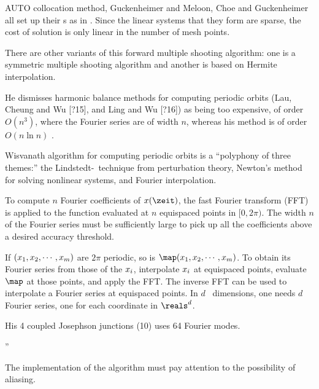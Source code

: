 \begin{description}
{AUTO collocation method, Guckenheimer and
Meloon, Choe and Guckenheimer all set up their
\po s as in . Since the linear systems that they form
are sparse, the cost of solution is only linear in the number of mesh
points.

There are other variants of this forward multiple shooting algorithm: one
is a symmetric multiple shooting algorithm and another is based on
Hermite interpolation.

He dismisses harmonic balance methods for computing periodic orbits (Lau,
Cheung and Wu [?15], and Ling and Wu [?16]) as being too expensive, of
order $O(n^3)$, where the Fourier series are of width $n$, whereas his
method is of order $O(n\ln{n})$ .

Wisvanath algorithm for computing periodic orbits is a ``polyphony of
three themes:'' the Lindstedt-\Poincare\ technique from perturbation
theory, Newton's method for solving nonlinear systems, and Fourier
interpolation.

To compute $n$ Fourier coefficients of $\ssp(\zeit)$, the fast Fourier
transform (FFT) is applied to the function evaluated at $n$ equispaced
points in $[0,2\pi)$. The width $n$ of the Fourier series must be
sufficiently large to pick up all the coefficients above a desired
accuracy threshold.

If $(x_1,x_2,\cdots,x_m)$ are $2\pi$ periodic, so is
$\map(\ssp_1,\ssp_2,\cdots,\ssp_m)$. To obtain its Fourier series from
those of the $x_i$, interpolate $x_i$ at equispaced points,
evaluate $\map$ at those points, and apply the FFT. The inverse FFT can be
used to interpolate a Fourier series at equispaced points.
In $d$ \statesp\ dimensions, one needs
$d$ Fourier series, one for each coordinate in $\reals^d$.

His 4 coupled Josephson junctions (10\dmn \statesp) uses 64 Fourier modes.

''

The implementation of the algorithm must pay attention to the possibility of
aliasing.
    }




\end{description}
